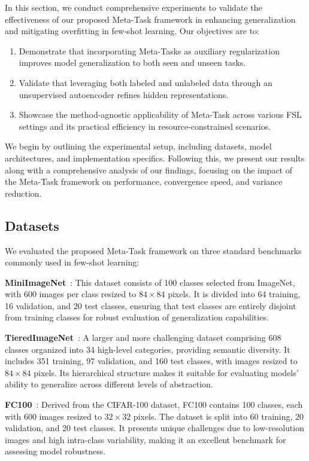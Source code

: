 In this section, we conduct comprehensive experiments to validate the effectiveness of our proposed {Meta-Task} framework in enhancing generalization and mitigating overfitting in few-shot learning. Our objectives are to: 
\begin{enumerate} 
\item Demonstrate that incorporating Meta-Tasks as auxiliary regularization improves model generalization to both seen and unseen tasks.
\item Validate that leveraging both labeled and unlabeled data through an unsupervised autoencoder refines hidden representations.
\item Showcase the method-agnostic applicability of {Meta-Task} across various FSL settings and its practical efficiency in resource-constrained scenarios. 
\end{enumerate}

We begin by outlining the experimental setup, including datasets, model architectures, and implementation specifics. Following this, we present our results along with a comprehensive analysis of our findings, focusing on the impact of the {Meta-Task} framework on performance, convergence speed, and variance reduction.

\subsection{Datasets}

We evaluated the proposed {Meta-Task} framework on three standard benchmarks commonly used in few-shot learning:

\noindent
\textbf{MiniImageNet}~\cite{mini-imagenet}: This dataset consists of 100 classes selected from ImageNet, with 600 images per class resized to $84 \times 84$ pixels. It is divided into 64 training, 16 validation, and 20 test classes, ensuring that test classes are entirely disjoint from training classes for robust evaluation of generalization capabilities.

\noindent
\textbf{TieredImageNet}~\cite{ren2018meta}: A larger and more challenging dataset comprising 608 classes organized into 34 high-level categories, providing semantic diversity. It includes 351 training, 97 validation, and 160 test classes, with images resized to $84 \times 84$ pixels. Its hierarchical structure makes it suitable for evaluating models' ability to generalize across different levels of abstraction.

\noindent
\textbf{FC100}~\cite{oreshkin2018tadam2}: Derived from the CIFAR-100 dataset, FC100 contains 100 classes, each with 600 images resized to $32 \times 32$ pixels. The dataset is split into 60 training, 20 validation, and 20 test classes. It presents unique challenges due to low-resolution images and high intra-class variability, making it an excellent benchmark for assessing model robustness.

